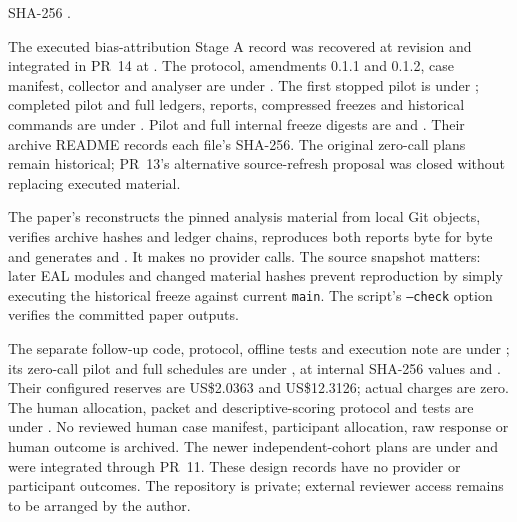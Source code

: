 \documentclass[preprint,12pt]{elsarticle}
\begin{document}
SHA-256 .

The executed bias-attribution Stage A record was recovered at revision  and integrated in PR~14 at . The protocol, amendments 0.1.1 and 0.1.2, case manifest, collector and analyser are under . The first stopped pilot is under ; completed pilot and full ledgers, reports, compressed freezes and historical commands are under . Pilot and full internal freeze digests are  and . Their archive README records each file's SHA-256. The original zero-call plans remain historical; PR~13's alternative source-refresh proposal was closed without replacing executed material.

The paper's  reconstructs the pinned analysis material from local Git objects, verifies archive hashes and ledger chains, reproduces both reports byte for byte and generates  and . It makes no provider calls. The source snapshot matters: later EAL modules and changed material hashes prevent reproduction by simply executing the historical freeze against current \texttt{main}. The script's \texttt{--check} option verifies the committed paper outputs.

The separate follow-up code, protocol, offline tests and execution note are under ; its zero-call pilot and full schedules are under , at internal SHA-256 values  and . Their configured reserves are US\$2.0363 and US\$12.3126; actual charges are zero. The human allocation, packet and descriptive-scoring protocol and tests are under . No reviewed human case manifest, participant allocation, raw response or human outcome is archived. The newer independent-cohort plans are under  and were integrated through PR~11. These design records have no provider or participant outcomes. The repository is private; external reviewer access remains to be arranged by the author.
\end{document}
